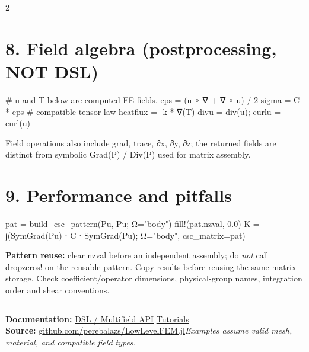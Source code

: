 \documentclass[a4paper,11pt]{extarticle}
\newcommand{\code}[1]{\mbox{\ttfamily\small #1}}
\begin{document}
\begin{multicols}{2}
\section{8. Field algebra (postprocessing, NOT DSL)}
\begin{julia}
# u and T below are computed FE fields.
eps = (u ∘ ∇ + ∇ ∘ u) / 2
sigma = C * eps  # compatible tensor law
heatflux = -k * ∇(T)
divu = div(u); curlu = curl(u)
\end{julia}
Field operations also include \code{grad}, \code{trace}, \code{∂x}, \code{∂y}, \code{∂z}; the returned fields are distinct from symbolic \code{Grad(P)} / \code{Div(P)} used for matrix assembly.
\section{9. Performance and pitfalls}
\begin{julia}
pat = build_csc_pattern(Pu, Pu; Ω="body")
fill!(pat.nzval, 0.0)
K = ∫(SymGrad(Pu) ⋅ C ⋅ SymGrad(Pu);
      Ω="body", csc_matrix=pat)
\end{julia}
\textbf{Pattern reuse:} clear \code{nzval} before an independent assembly; do \emph{not} call \code{dropzeros!} on the reusable pattern. Copy results before reusing the same matrix storage. Check coefficient/operator dimensions, physical-group names, integration order and shear conventions.
\vspace{2mm}\hrule\vspace{1mm}
{\footnotesize\textbf{Documentation:} \href{https://perebalazs.github.io/LowLevelFEM.jl/dev/reference/multifield/}{DSL / Multifield API} \quad \href{https://perebalazs.github.io/LowLevelFEM.jl/dev/tutorials/}{Tutorials}\\
\textbf{Source:} \href{https://github.com/perebalazs/LowLevelFEM.jl}{github.com/perebalazs/LowLevelFEM.jl}\quad\textit{Examples assume valid mesh, material, and compatible field types.}}
\end{multicols}
\end{document}
